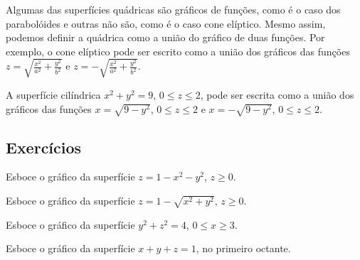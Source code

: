 \begin{ex}
Algumas das superfícies quádricas são gráficos de funções, como é o caso dos parabolóides e outras não são, como é o caso cone elíptico. Mesmo assim, podemos definir a quádrica como a união do gráfico de duas funções. Por exemplo, o cone elíptico pode ser escrito como a união dos gráficos das funções $z=\sqrt{\frac{x^2}{a^2}+\frac{y^2}{b^2}}$ e $z=-\sqrt{\frac{x^2}{a^2}+\frac{y^2}{b^2}}$.
\end{ex}

\begin{ex}A superfície cilíndrica $x^2+y^2=9$, $0\leq z\leq 2$, pode ser escrita como a união dos gráficos das funções $x=\sqrt{9-y^2}$, $0\leq z\leq 2$ e $x=-\sqrt{9-y^2}$, $0\leq z\leq 2$.
\end{ex}

\subsection*{Exercícios}
\begin{exer}Esboce o gráfico da superfície $z=1-x^2-y^2$, $z\geq0$.
\end{exer}
\begin{exer}Esboce o gráfico da superfície $z=1-\sqrt{x^2+y^2}$, $z\geq0$.
\end{exer}
\begin{exer}Esboce o gráfico da superfície $y^2+z^2=4$, $0\leq x\geq 3$.
\end{exer}
\begin{exer}Esboce o gráfico da superfície $x+y+z=1$, no primeiro octante.
\end{exer}

